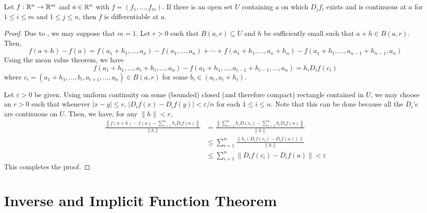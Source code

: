 \begin{theorem}
    Let $f:\mathbb{R}^n\to\mathbb{R}^m$ and $a\in\mathbb{R}^n$ with $f = (f_1,\ldots,f_m)$. If there is an open set $U$ containing $a$ on which $D_jf_i$ exists and is continuous at $a$ for $1\le i\le m$ and $1\le j\le n$, then $f$ is differentiable at $a$.
\end{theorem}
\begin{proof}
    Due to , we may suppose that $m = 1$. Let $r > 0$ such that $B(a,r)\subseteq U$ and $h$ be sufficiently small such that $a + h\in B(a,r)$. Then, 
    \begin{equation*}
        f(a + h) - f(a) = f(a_1 + h_1,\dots,a_n) - f(a_1,\dots,a_n) + \cdots + f(a_1 + h_1,\dots,a_n + h_n) - f(a_1 + h_1,\dots,a_{n - 1} + h_{n - 1}, a_n)
    \end{equation*}
    Using the mean value theorem, we have 
    \begin{equation*}
        f(a_1 + h_1,\dots,a_i + h_i,\dots,a_n) - f(a_1 + h_1,\dots,a_{i - 1} + h_{i - 1},\dots,a_n) = h_i D_if(c_i)
    \end{equation*}
    where $c_i = (a_1 + h_1,\dots,b_i,a_{i + 1},\dots,a_n)\in B(a,r)$ for some $b_i\in(a_i,a_i + h_i)$. 
    
    Let $\varepsilon > 0$ be given. Using uniform continuity on some (bounded) closed (and therefore compact) rectangle contained in $U$, we may choose an $r > 0$ such that whenever $|x - y|\le r$, $|D_if(x) - D_if(y)| < \varepsilon/n$ for each $1\le i\le n$. Note that this can be done because all the $D_i$'s are continuous on $U$. Then, we have, for any $\|h\| < r$,
    \begin{align*}
        \frac{\left\|f(a + h) - f(a) - \sum_{i = 1}^n h_iD_if(a)\right\|}{\|h\|} &= \frac{\left\|\sum_{i = 1}^nh_iD(c_i) - \sum_{i=1}^nh_iD_if(a)\right\|}{\|h\|}\\
        &\le\sum_{i = 1}^n\frac{\|h_i(D_if(c_i) - D_if(a))\|}{\|h\|}\\
        &\le \sum_{i = 1}^n\|D_if(c_i) - D_if(a)\| < \varepsilon
    \end{align*}
    This completes the proof.
\end{proof}

\section{Inverse and Implicit Function Theorem}

\begin{lemma}
    
\end{lemma}

